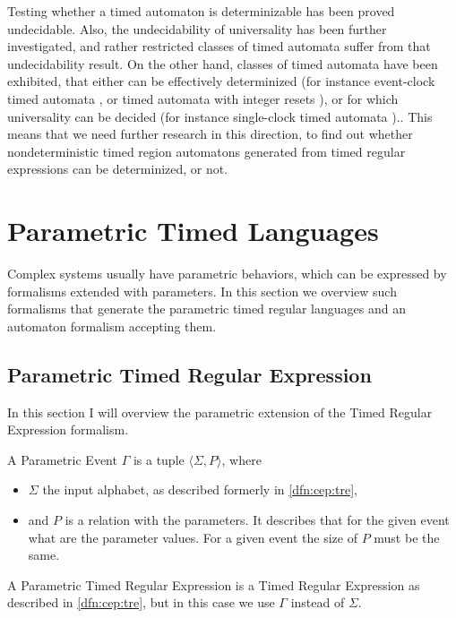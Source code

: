 			Testing whether a timed automaton is determinizable has been proved undecidable\citep{finkel2006undecidable}.
			Also, the undecidability of universality has been further investigated, and rather restricted classes of timed automata suffer from that undecidability result. On the other hand, classes of timed automata have been exhibited, that either can be effectively determinized (for instance event-clock timed automata \citep{alur1994determinizable}, or timed automata
			with integer resets \citep{suman2008timed}), or for which universality can be decided (for instance single-clock timed automata \citep{ouaknine2004language}).\citep{baier2009timed}.
			This means that we need further research in this direction, to find out whether nondeterministic timed region automatons generated from timed regular expressions can be determinized, or not.
			
	
	\section{Parametric Timed Languages}
	
			Complex systems usually have parametric behaviors, which can be expressed by formalisms extended with parameters. In this section we overview such formalisms that generate the parametric timed regular languages and an automaton formalism accepting them.
			
		\subsection{Parametric Timed Regular Expression}
		
		In this section I will overview the parametric extension of the Timed Regular Expression formalism.
			
			\begin{dfn}
				\label{dfn:cep:ptrea:event}
				A Parametric Event $\Gamma$ is a tuple $\langle \Sigma, P \rangle$, where 
				\begin{itemize}
					\item $\Sigma$ the input alphabet, as described formerly in \cref{dfn:cep:tre},
					\item and $P$ is a relation with the parameters. It describes that for the given event what are the parameter values. For a given event the size of $P$ must be the same.
				\end{itemize}
			\end{dfn}
			
	
			\begin{dfn}
			A Parametric Timed Regular Expression is a Timed Regular Expression as described in \cref{dfn:cep:tre}, but in this case we use $\Gamma$ instead of $\Sigma$.
			
			\end{dfn}
			
